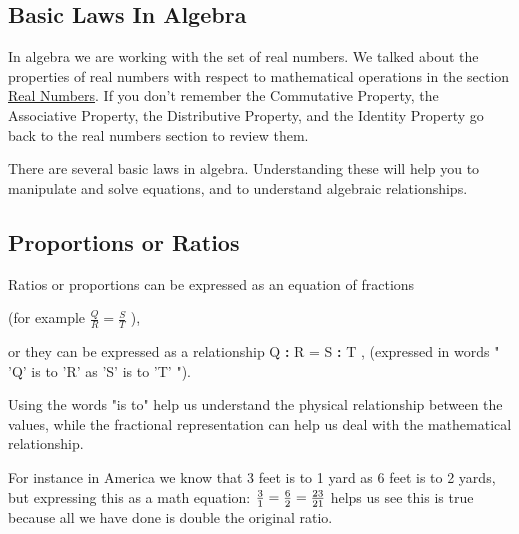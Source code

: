 \subsection{Basic Laws In Algebra}
\label{sss:basi-ea58}




In algebra we are working with the set of real numbers. We talked about the properties of
real numbers with respect to mathematical operations in the section
\href{Algebra/Real_Numbers "wikilink"}{Real Numbers}. If you don't remember the
Commutative Property, the Associative Property, the Distributive Property, and the
Identity Property go back to the real numbers section to review them.



There are several basic laws in algebra. Understanding these will help you to manipulate
and solve equations, and to understand algebraic relationships.




\subsection{Proportions or Ratios}
\label{sss:prop-b2c0}




Ratios or proportions can be expressed as an equation of fractions



(for example $\frac {Q}{R} = \frac {S}{T}$ ),



or they can be expressed as a relationship Q \textbf{:} R = S \textbf{:} T , (expressed in
words " 'Q' is to 'R' as 'S' is to 'T' ").



Using the words "is to" help us understand the physical relationship between the values,
while the fractional representation can help us deal with the mathematical relationship.



For instance in America we know that 3 feet is to 1 yard as 6 feet is to 2 yards, but
expressing this as a math equation: $\frac {3}{1} = \frac {6}{2} = \frac {2\*3}{2\*1}$
helps us see this is true because all we have done is double the original ratio.



